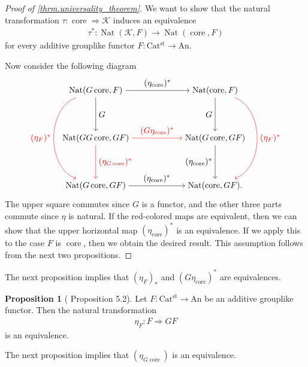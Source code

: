 \documentclass[a4paper,dvipdfmx,11pt,reqno]{amsart}
\DeclareMathOperator{\Nat}{Nat}
\newcommand{\K}{\mathcal{K}}
\DeclareMathOperator{\core}{core}
\newcommand{\An}{\mathrm{An}}
\newcommand{\Catst}{\mathrm{Cat^{st}}}
\theoremstyle{definition}
\newtheorem{proposition}[theorem]{Proposition}
\begin{document}
\begin{proof}[Proof of \cref{thrm.universality_theorem}]
  We want to show that the natural transformation $\tau : \core \Rightarrow \K$ induces an equivalence
  \begin{align*}
    \tau^{\ast} : \Nat(\K,F) \to \Nat(\core,F)
  \end{align*}
  for every additive grouplike functor $F : \Catst \to \An$.
  
  Now consider the following diagram 
  \[\begin{tikzpicture}[auto,->]
    \node (tl) at (0,4) {$\Nat(G\core,F)$};
    \node (tr) at (5,4) {$\Nat(\core,F)$};
    \node (ml) at (0,2) {$\Nat(GG\core,GF)$};
    \node (mr) at (5,2) {$\Nat(G\core,GF)$};
    \node (bl) at (0,0) {$\Nat(G\core,GF)$};
    \node (br) at (5,0) {$\Nat(\core,GF).$};
    \draw (tl) -- node {$(\eta_{\core})^\ast$} (tr);
    \draw[red] (ml) -- node {$(G\eta_{\core})^\ast$} (mr);
    \draw (bl) -- node {$(\eta_{\core})^\ast$} (br);
    \draw (tl) -- node {$G$} (ml);
    \draw[red] (ml) -- node {$(\eta_{G\core})^\ast$} (bl);
    \draw (tr) -- node[swap] {$G$} (mr);
    \draw (mr) -- node[swap] {$(\eta_{\core})^\ast$} (br); 
    \draw[bend right=70,red] (tl) to node[swap] {$(\eta_{F})^\ast$} (bl);
    \draw[bend left=70,red] (tr) to node {$(\eta_{F})^\ast$} (br);
  \end{tikzpicture}\]
  The upper square commutes since $G$ is a functor, and the other three parts commute since $\eta$ is natural.
  If the red-colored maps are equivalent, then we can show that the upper horizontal map $(\eta_{\core})^\ast$ is an equivalence.
  If we apply this to the case $F$ is $\core$, then we obtain the desired result.
  This assumption follows from the next two propositions.
\end{proof}

The next proposition implies that $(\eta_{F})_{\ast}$ and $(G\eta_{\core})^{\ast}$ are equivalences.

\begin{proposition}[\cite{HLS23} Proposition 5.2] \label{HLS23.prop.5.2}
  Let $F : \Catst \to \An$ be an additive grouplike functor.
  Then the natural transformation
  \begin{align*}
    \eta_{F} : F \Rightarrow GF
  \end{align*}
  is an equivalence. 
\end{proposition}

The next proposition implies that $(\eta_{G\core})$ is an equivalence.
\end{document}
